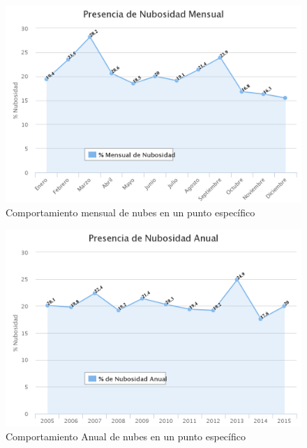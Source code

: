 \begin{figure}[htb]
  \centering 
  \includegraphics[scale=0.25]{pictures/nm.png}
  \caption{Comportamiento mensual de nubes en un punto específico}
  \label{fig:nubesmes}
\end{figure}
\begin{figure}[htb]
  \centering 
  \includegraphics[scale=0.25]{pictures/ny.png}
  \caption{Comportamiento Anual de nubes en un punto específico}
  \label{fig:nubesy}
\end{figure}